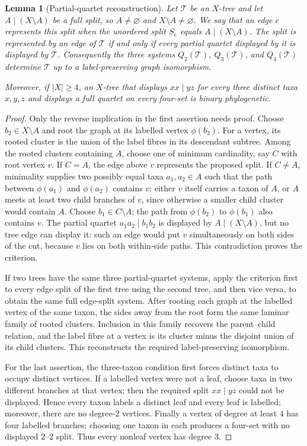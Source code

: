 \documentclass[pdflatex,sn-mathphys-num]{sn-jnl}
\theoremstyle{thmstyleone}
\newtheorem{lemma}{Lemma}
\begin{document}
\begin{lemma}[Partial-quartet reconstruction]\label{lem:partial-reconstruction}
Let $\mathcal T$ be an $X$-tree and let $A\mid(X\setminus A)$ be a full
split, so $A\ne\varnothing$ and $X\setminus A\ne\varnothing$.  We say that
an edge $e$ represents this split when the unordered split $S_e$ equals
$A\mid(X\setminus A)$.  The split is represented by an edge of $\mathcal T$
if and only if every partial quartet displayed by it is displayed by
$\mathcal T$.  Consequently the three systems $Q_2(\mathcal T)$,
$Q_3(\mathcal T)$, and $Q_4(\mathcal T)$ determine $\mathcal T$ up to a
label-preserving graph isomorphism.

Moreover, if $|X|\ge4$, an $X$-tree that displays $xx\mid yz$ for every
three distinct taxa $x,y,z$ and displays a full quartet on every four-set is
binary phylogenetic.
\end{lemma}

\begin{proof}
Only the reverse implication in the first assertion needs proof.  Choose
$b_2\in X\setminus A$ and root the graph at its labelled vertex $\phi(b_2)$.
For a vertex, its rooted cluster is the union of the label fibres in its
descendant subtree.  Among the rooted clusters containing $A$, choose one of
minimum cardinality, say $C$ with root vertex $v$.
If $C=A$, the edge above $v$ represents the proposed split.  If $C\ne A$,
minimality supplies two possibly equal taxa $a_1,a_2\in A$ such that the path
between $\phi(a_1)$ and $\phi(a_2)$ contains $v$: either $v$ itself carries a
taxon of $A$, or $A$ meets
at least two child branches of $v$, since otherwise a smaller child cluster
would contain $A$.  Choose $b_1\in C\setminus A$; the path from
$\phi(b_2)$ to $\phi(b_1)$ also contains $v$.  The partial quartet
$a_1a_2\mid b_1b_2$ is displayed by $A\mid(X\setminus A)$, but no tree edge
can display it: such an edge would put $v$ simultaneously on both sides of
the cut, because $v$ lies on both within-side paths.  This contradiction
proves the criterion.

If two trees have the same three partial-quartet systems, apply the criterion
first to every edge split of the first tree using the second tree, and then
vice versa, to obtain the same full edge-split system.  After rooting each
graph at the labelled vertex of the same taxon, the sides away from the root
form the same
laminar family of rooted clusters.  Inclusion in this family recovers the
parent--child relation, and the label fibre at a vertex is its cluster minus
the disjoint union of its child clusters.  This reconstructs the required
label-preserving isomorphism.

For the last assertion, the three-taxon condition first forces distinct taxa
to occupy distinct vertices.  If a labelled vertex were not a leaf, choose
taxa in two different branches at that vertex; then the required split
$xx\mid yz$ could not be displayed.  Hence every taxon labels a distinct
leaf and every leaf is labelled; moreover, there are no degree-$2$ vertices.
Finally a vertex of degree at
least $4$ has four labelled branches; choosing one taxon in each produces a
four-set with no displayed $2$--$2$ split.  Thus every nonleaf vertex has
degree $3$.
\end{proof}
\end{document}
